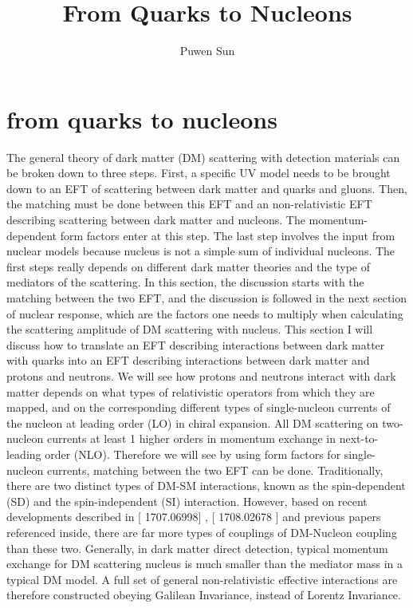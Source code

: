 \documentclass[12pt]{article}
\begin{document}
\title{From Quarks to Nucleons}
\author{Puwen Sun}
\date{}
\maketitle



 \section{from quarks to nucleons}
 The general theory of dark matter (DM) scattering with detection materials can be broken down to three steps. First, a specific UV model needs to be brought down to an EFT of scattering between dark matter and quarks and gluons. Then, the matching must be done between this EFT and an non-relativistic EFT describing scattering between dark matter and nucleons. The momentum-dependent form factors enter at this step.  The last step involves the input from nuclear models because nucleus is not a simple sum of individual nucleons. The first steps really depends on different dark matter theories and the type of mediators of the scattering. In this section, the discussion starts with the matching between the two EFT, and the discussion is followed in the next section of nuclear response, which are the factors one needs to multiply when calculating the scattering amplitude of DM scattering with nucleus. 
 This section I will discuss how to translate an EFT describing interactions between dark matter with quarks into an EFT describing interactions between dark matter and protons and neutrons. 
 We will see how protons and neutrons interact with dark matter depends on what types of relativistic operators from which they are mapped, and on the corresponding different types of single-nucleon currents of the nucleon at leading order (LO) in chiral expansion.
  All DM scattering on two-nucleon currents at least 1 higher orders in momentum exchange in next-to-leading order (NLO). 
  Therefore we will see by using form factors for single-nucleon currents, matching between the two EFT can be done. 
 Traditionally, there are two distinct types of DM-SM interactions, known as the spin-dependent (SD) and the spin-independent (SI) interaction. 
 However, based on recent developments described in [ 1707.06998] , [ 1708.02678 ] and previous papers referenced inside, there are far more types of couplings of DM-Nucleon coupling than these two. 
 Generally, in dark matter direct detection, typical momentum exchange for DM scattering nucleus is much smaller than the mediator mass in a typical DM model. A full set of general non-relativistic effective interactions are therefore constructed obeying Galilean Invariance, instead of Lorentz Invariance. 
\end{document}

